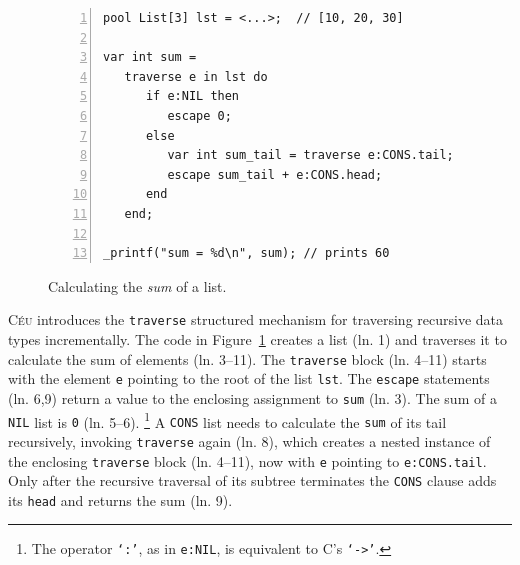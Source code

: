 \documentclass{sig-alternate}
\newcommand{\CEU}{\textsc{C\'{e}u}\xspace}
\newcommand{\code}[1] {{\small{\texttt{#1}}}}
\begin{document}
\begin{figure}[t]
\begin{lstlisting}[numbers=left,xleftmargin=3em]
pool List[3] lst = <...>;  // [10, 20, 30]

var int sum =
   traverse e in lst do
      if e:NIL then
         escape 0;
      else
         var int sum_tail = traverse e:CONS.tail;
         escape sum_tail + e:CONS.head;
      end
   end;

_printf("sum = %d\n", sum); // prints 60
\end{lstlisting}
\caption{
Calculating the \emph{sum} of a list.
\label{lst.list.sum}
}
\end{figure}

\CEU introduces the \code{traverse} structured mechanism for traversing 
recursive data types incrementally.
%
The code in Figure~\ref{lst.list.sum} creates a list (ln. 1) and traverses it 
to calculate the sum of elements (ln. 3--11).
The \code{traverse} block (ln. 4--11) starts with the element \code{e} 
pointing to the root of the list \code{lst}.
The \code{escape} statements (ln. 6,9) return a value to the enclosing 
assignment to \code{sum} (ln. 3).
The sum of a \code{NIL} list is \code{0} (ln. 5--6).%
\footnote{
The operator \code{`:'}, as in \code{e:NIL}, is equivalent to C's \code{`->'}.
}
A \code{CONS} list needs to calculate the \code{sum} of its tail recursively, 
invoking \code{traverse} again (ln. 8), which creates a nested instance of the 
enclosing \code{traverse} block (ln. 4--11), now with \code{e} pointing to 
\code{e:CONS.tail}.
Only after the recursive traversal of its subtree terminates the \code{CONS} 
clause adds its \code{head} and returns the sum (ln. 9).
\end{document}
